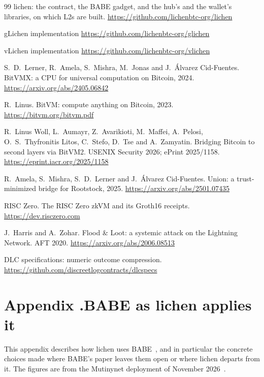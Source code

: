 \documentclass[11pt]{article}
\begin{document}
\begin{thebibliography}{99}
 lichen: the contract, the BABE gadget, and the hub's and the wallet's libraries, on which L2s are built. \url{https://github.com/lichenbtc-org/lichen}

 gLichen implementation \url{https://github.com/lichenbtc-org/glichen}

 vLichen implementation \url{https://github.com/lichenbtc-org/vlichen}

 S.~D.~Lerner, R.~Amela, S.~Mishra, M.~Jonas and J.~\'Alvarez Cid-Fuentes. BitVMX: a CPU for universal computation on Bitcoin, 2024. \url{https://arxiv.org/abs/2405.06842}

 R.~Linus. BitVM: compute anything on Bitcoin, 2023. \url{https://bitvm.org/bitvm.pdf}

 R.~Linus Woll, L.~Aumayr, Z.~Avarikioti, M.~Maffei, A.~Pelosi, O.~S.~Thyfronitis Litos, C.~Stefo, D.~Tse and A.~Zamyatin. Bridging Bitcoin to second layers via BitVM2. USENIX Security 2026; ePrint 2025/1158. \url{https://eprint.iacr.org/2025/1158}

 R.~Amela, S.~Mishra, S.~D.~Lerner and J.~\'Alvarez Cid-Fuentes. Union: a trust-minimized bridge for Rootstock, 2025. \url{https://arxiv.org/abs/2501.07435}

 RISC Zero. The RISC Zero zkVM and its Groth16 receipts. \url{https://dev.risczero.com}

 J.~Harris and A.~Zohar. Flood \& Loot: a systemic attack on the Lightning Network. AFT 2020. \url{https://arxiv.org/abs/2006.08513}

 DLC specifications: numeric outcome compression. \url{https://github.com/discreetlogcontracts/dlcspecs}

\end{thebibliography}

\appendix
\section*{Appendix \thesection.\enspace BABE as lichen applies it}
\label{app:babe}

This appendix describes how lichen uses BABE~\cite{babe}, and in
particular the concrete choices made where BABE's paper leaves them
open or where lichen departs from it. The figures are from the
Mutinynet deployment of November 2026~\cite{vlichencode}.
\end{document}
